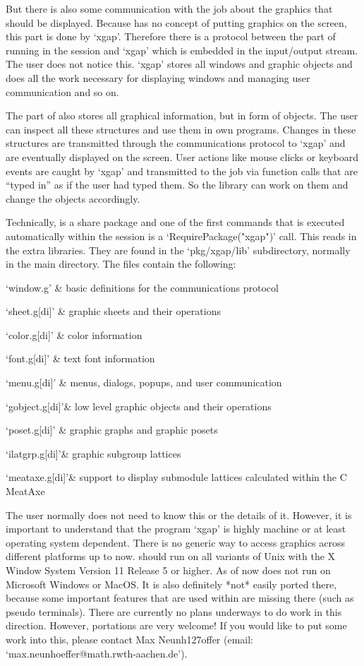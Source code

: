 But there is also some communication with the {\GAP} job about the graphics
that should be displayed. Because {\GAP} has no concept of putting graphics
on the screen, this part is done by `xgap'. Therefore there is a protocol
between the {\GAP} part of {\XGAP} running in the {\GAP} session and `xgap' 
which is embedded in the input/output stream. The user does not notice
this. `xgap' stores all windows and graphic objects and does all the work
necessary for displaying windows and managing user communication and so on.

The {\GAP} part of {\XGAP} also stores all graphical information, but in
form of {\GAP} objects. The user can inspect all these structures and use
them in own programs. Changes in these structures are transmitted through
the communications protocol to `xgap' and are eventually displayed on the
screen. User actions like mouse clicks or keyboard events are caught by
`xgap' and transmitted to the {\GAP} job via function calls that are
``typed in'' as if the user had typed them. So the library can work on them 
and change the {\GAP} objects accordingly.

Technically, {\XGAP} is a share package and one of the first commands that
is executed automatically within the {\GAP} session is a
`RequirePackage("xgap")' call. This reads in the extra {\XGAP}
libraries. They are found in the `pkg/xgap/lib' subdirectory, normally in the
main {\GAP} directory. The files contain the following:

\beginitems
`window.g' & basic definitions for the communications protocol

`sheet.g[di]' & graphic sheets and their operations 

`color.g[di]' & color information

`font.g[di]'  & text font information

`menu.g[di]'  & menus, dialogs, popups, and user communication

`gobject.g[di]'& low level graphic objects and their operations

`poset.g[di]' & graphic graphs and graphic posets

`ilatgrp.g[di]'& graphic subgroup lattices

`meataxe.g[di]'& support to display submodule lattices calculated within
the C MeatAxe
\enditems

The user normally does not need to know this or the details of it. However, 
it is important to understand that the program `xgap' is highly machine or
at least operating system dependent. There is no generic way to access
graphics across different platforms up to now. {\XGAP} should run on all
variants of Unix with the X Window System Version 11 Release 5 or
higher. As of now {\XGAP} does not run on Microsoft Windows or MacOS. It is 
also definitely *not* easily ported there, because some important features
that are used within {\XGAP} are missing there (such as pseudo terminals).
There are currently no plans underways to do work in this direction.
However, portations are very welcome! If you would like to put some work
into this, please contact Max Neunh\accent127offer (email:
`max.neunhoeffer@math.rwth-aachen.de'). 

